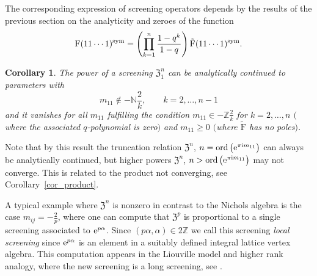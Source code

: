 \documentclass[pdftex]{sigma}%
\numberwithin{equation}{section}
\newtheorem{cor}[teo]{Corollary}
\newcommand{\N}{\mathbb{N}}
\newcommand{\Z}{\mathbb{Z}}
\renewcommand{\i}{\mathrm{i}}
\newcommand{\zem}{\mathfrak{Z}}
\newcommand{\Fp}{\mathrm{F}}
\newcommand{\rFp}{\tilde{\mathrm{F}}}
\begin{document}
The corresponding expression of screening operators depends by the results of the previous section on the analyticity and zeroes of the function
\[
\Fp(11\cdots1)^{{\rm sym}}=\left(\prod_{k=1}^n\frac{1-q^k}{1-q} \right)\rFp(11\cdots1)^{{\rm sym}}.
\]

\begin{cor}\label{cor_trun}
The power of a screening $\zem_1^n$ can be analytically continued to parameters with
\[m_{11}\not\in -\N\frac{2}{k},\qquad k=2,\dots, n-1\]
and it vanishes for all $m_{11}$ fulfilling the condition $m_{11}\in -\Z\frac{2}{k}$ for $k=2,\dots, n$ $($where the associated $q$-polynomial is zero$)$ and $m_{11}\geq 0$ $($where $\rFp$ has no poles$)$.
\end{cor}
Note that by this result the truncation relation $\zem^n$, $n=\operatorname{ord}\big({\rm e}^{\pi\i m_{11}}\big)$ can always be analytically continued, but higher powers $\zem^n$, $n>\operatorname{ord}\big({\rm e}^{\pi\i m_{11}}\big)$ may not converge. This is related to the product not converging, see Corollary~\ref{cor_product}.

A typical example where $\zem^n$ is nonzero in contrast to the Nichols algebra is the case $m_{ij}=-\frac{2}{p}$, where one can compute that $\zem^p$ is proportional to a single screening associated to ${\rm e}^{p\alpha}$. Since $(p\alpha,\alpha)\in 2\Z$ we call this screening \emph{local screening} since ${\rm e}^{p\alpha}$ is an element in a suitably defined integral lattice vertex algebra. This computation appears in the Liouville model and higher rank analogy, where the new screening is a long screening, see \cite[Section~6.4]{Len17}.
\end{document}
